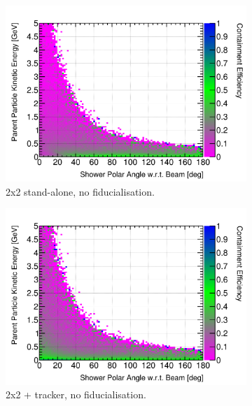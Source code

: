 \documentclass[10pt,a4paper,openany]{article}
\begin{document}
\begin{figure}[htbp]
	\centering
	\begin{subfigure}[b]{0.49\textwidth}
		\centering
		\includegraphics[width=1.0\textwidth]{EM_cont_eff_2x2.png}
		\caption{2x2 stand-alone, no fiducialisation.}
		\label{}
	\end{subfigure}	
	\hfill
	\begin{subfigure}[b]{0.49\textwidth}
		\centering
		\includegraphics[width=1.0\textwidth]{EM_cont_eff_2x2_Scintillator_gap.png}
		\caption{2x2 + tracker, no fiducialisation.}
		\label{}
	\end{subfigure}	
	\begin{subfigure}[b]{0.49\textwidth}
		\centering

\end{subfigure}
\end{figure}
\end{document}
